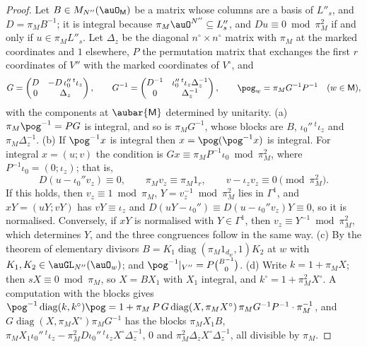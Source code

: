 \documentclass[10pt]{amsart}
\theoremstyle{definition}
\theoremstyle{remark}
\begin{document}
\begin{proof}
Let $B\in M_{N''}(\auO_{\mathsf M})$ be a matrix whose columns are a basis of $L''_s$, and
$D=\pi_MB^{-1}$; it is integral because $\pi_M\auO^{N''}\subseteq L''_s$, and $Du\equiv0\bmod
\pi_M^2$ if and only if $u\in\pi_ML''_s$. Let $\Delta_z$ be the diagonal $n^\circ\times n^\circ$
matrix with $\pi_M$ at the marked coordinates and $1$ elsewhere, $P$ the permutation matrix that
exchanges the first $r$ coordinates of $V''$ with the marked coordinates of $V^\circ$, and
\[
G=\begin{pmatrix}D&-D\,\iota_0''\,{}^t\iota_z\\0&\Delta_z\end{pmatrix},\qquad
G^{-1}=\begin{pmatrix}D^{-1}&\iota_0''\,{}^t\iota_z\Delta_z^{-1}\\0&\Delta_z^{-1}\end{pmatrix},
\qquad\pog_w=\pi_MG^{-1}P^{-1}\quad(w\in\mathsf M),
\]
with the components at $\aubar{\mathsf M}$ determined by unitarity. (a) $\pi_M\pog^{-1}=PG$ is
integral, and so is $\pi_MG^{-1}$, whose blocks are $B$, $\iota_0''\,{}^t\iota_z$ and
$\pi_M\Delta_z^{-1}$. (b) If $\pog^{-1}x$ is integral then $x=\pog(\pog^{-1}x)$ is integral. For
integral $x=(u;v)$ the condition is $Gx\equiv\pi_MP^{-1}\iota_0\bmod\pi_M^2$, where
$P^{-1}\iota_0=(0;\iota_z)$; that is,
\[
D(u-\iota_0''v_z)\equiv0,\qquad\pi_Mv_z\equiv\pi_M1_r,\qquad v-\iota_zv_z\equiv0\pmod{\pi_M^2}.
\]
If this holds, then $v_z\equiv1\bmod\pi_M$, $Y=v_z^{-1}\bmod\pi_M^2$ lies in $\Gamma^1$, and
$xY=(uY;vY)$ has $vY\equiv\iota_z$ and $D(uY-\iota_0'')\equiv D(u-\iota_0''v_z)Y\equiv0$, so it is
normalised. Conversely, if $xY$ is normalised with $Y\in\Gamma^1$, then $v_z\equiv Y^{-1}\bmod
\pi_M^2$, which determines $Y$, and the three congruences follow in the same way. (c) By the
theorem of elementary divisors $B=K_1\operatorname{diag}(\pi_M1_{d_w},1)K_2$ at $w$ with
$K_1,K_2\in\auGL_{N''}(\auO_w)$; and $\pog^{-1}|_{V''}=P\binom{B^{-1}}0$. (d) Write $k=1+\pi_MX$;
then $sX\equiv0\bmod\pi_M$, so $X=BX_1$ with $X_1$ integral, and $k^\circ=1+\pi_M^2X^\circ$. A
computation with the blocks gives
$\pog^{-1}\operatorname{diag}(k,k^\circ)\pog=1+\pi_M\,P\,G\operatorname{diag}(X,\pi_MX^\circ)
\,\pi_MG^{-1}P^{-1}\cdot\pi_M^{-1}$, and $G\operatorname{diag}(X,\pi_MX^\circ)\pi_MG^{-1}$ has the
blocks $\pi_MX_1B$, $\pi_MX_1\iota_0''\,{}^t\iota_z-\pi_M^2D\iota_0''\,{}^t\iota_zX^\circ
\Delta_z^{-1}$, $0$ and $\pi_M^2\Delta_zX^\circ\Delta_z^{-1}$, all divisible by $\pi_M$.
\end{proof}
\end{document}
